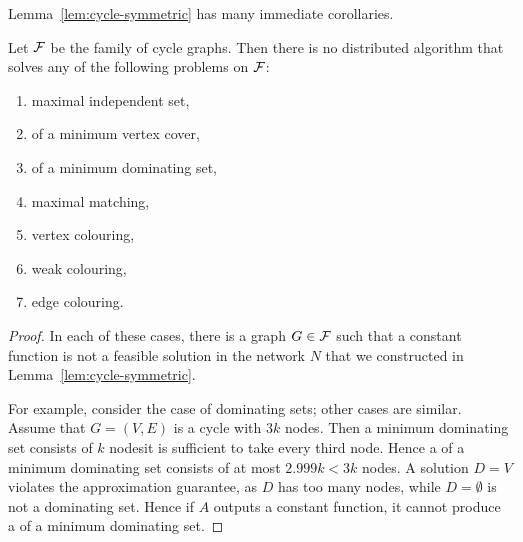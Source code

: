 Lemma~\ref{lem:cycle-symmetric} has many immediate corollaries.

\begin{corollary}\label{cor:cycle-symmetric}
    Let $\mathcal{F}$ be the family of cycle graphs. Then there is no distributed algorithm that solves any of the following problems on $\mathcal{F}$:
    \begin{enumerate}[noitemsep]
        \item maximal independent set,
        \item {} of a minimum vertex cover,
        \item {} of a minimum dominating set,
        \item maximal matching,
        \item vertex colouring,
        \item weak colouring,
        \item edge colouring.
    \end{enumerate}
\end{corollary}
\begin{proof}
    In each of these cases, there is a graph $G \in \mathcal{F}$ such that a constant function is not a feasible solution in the network $N$ that we constructed in Lemma~\ref{lem:cycle-symmetric}.
    
    For example, consider the case of dominating sets; other cases are similar. Assume that $G = (V,E)$ is a cycle with $3k$ nodes. Then a minimum dominating set consists of $k$ nodes\mydash it is sufficient to take every third node. Hence a  of a minimum dominating set consists of at most $2.999k < 3k$ nodes. A solution $D = V$ violates the approximation guarantee, as $D$ has too many nodes, while $D = \emptyset$ is not a dominating set. Hence if $A$ outputs a constant function, it cannot produce a  of a minimum dominating set.
\end{proof}

